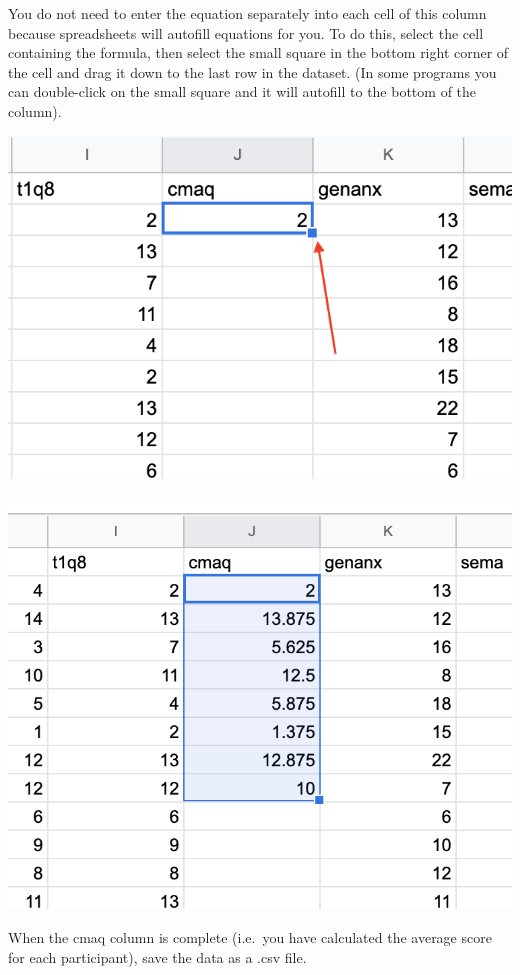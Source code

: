 \documentclass[
]{book}
\begin{document}
You do not need to enter the equation separately into each cell of this column because spreadsheets will autofill equations for you. To do this, select the cell containing the formula, then select the small square in the bottom right corner of the cell and drag it down to the last row in the dataset. (In some programs you can double-click on the small square and it will autofill to the bottom of the column).

\includegraphics{img/smallbox.png}

\includegraphics{img/pull.png}

When the cmaq column is complete (i.e.~you have calculated the average score for each participant), save the data as a .csv file.
\end{document}
